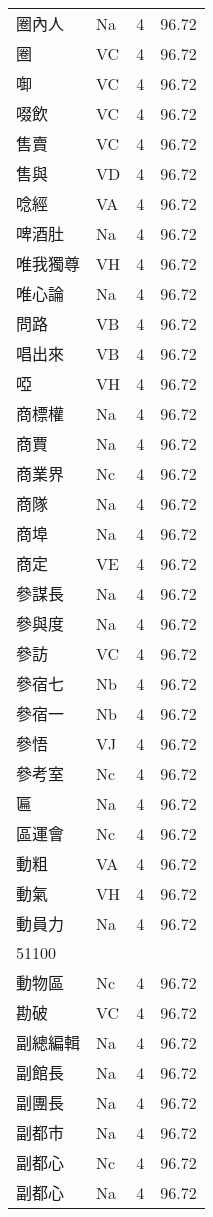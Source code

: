 \documentclass[twocolumn]{book}
\begin{document}
\begin{supertabular}{llrr}
圈內人 & Na & 4 &  96.72\\
圈 & VC & 4 &  96.72\\
啣 & VC & 4 &  96.72\\
啜飲 & VC & 4 &  96.72\\
售賣 & VC & 4 &  96.72\\
售與 & VD & 4 &  96.72\\
唸經 & VA & 4 &  96.72\\
啤酒肚 & Na & 4 &  96.72\\
唯我獨尊 & VH & 4 &  96.72\\
唯心論 & Na & 4 &  96.72\\
問路 & VB & 4 &  96.72\\
唱出來 & VB & 4 &  96.72\\
啞 & VH & 4 &  96.72\\
商標權 & Na & 4 &  96.72\\
商賈 & Na & 4 &  96.72\\
商業界 & Nc & 4 &  96.72\\
商隊 & Na & 4 &  96.72\\
商埠 & Na & 4 &  96.72\\
商定 & VE & 4 &  96.72\\
參謀長 & Na & 4 &  96.72\\
參與度 & Na & 4 &  96.72\\
參訪 & VC & 4 &  96.72\\
參宿七 & Nb & 4 &  96.72\\
參宿一 & Nb & 4 &  96.72\\
參悟 & VJ & 4 &  96.72\\
參考室 & Nc & 4 &  96.72\\
匾 & Na & 4 &  96.72\\
區運會 & Nc & 4 &  96.72\\
動粗 & VA & 4 &  96.72\\
動氣 & VH & 4 &  96.72\\
動員力 & Na & 4 &  96.72\\
51100\\
動物區 & Nc & 4 &  96.72\\
勘破 & VC & 4 &  96.72\\
副總編輯 & Na & 4 &  96.72\\
副館長 & Na & 4 &  96.72\\
副團長 & Na & 4 &  96.72\\
副都市 & Na & 4 &  96.72\\
副都心 & Nc & 4 &  96.72\\
副都心 & Na & 4 &  96.72\\

\end{supertabular}
\end{document}
